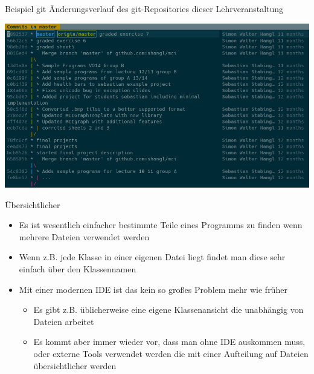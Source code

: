 \documentclass[presentation]{beamer}
\begin{document}
\begin{frame}[label={sec:orgfc16cf5}]{Beispiel git}
Änderungsverlauf des git-Repositories dieser Lehrveranstaltung
\begin{center}\begin{center}
\includegraphics[width=1.0\textwidth]{img/screenshot-20180608-171423.png}
\end{center}\end{center}
\end{frame}
\begin{frame}[label={sec:org2c17d14}]{Übersichtlicher}
\begin{itemize}
\item Es ist wesentlich einfacher bestimmte Teile eines Programms zu
finden wenn mehrere Dateien verwendet werden
\item Wenn z.B. jede Klasse in einer eigenen Datei liegt findet man diese
sehr einfach über den Klassennamen
\item Mit einer modernen IDE ist das kein so großes Problem mehr wie früher
\begin{itemize}
\item Es gibt z.B. üblicherweise eine eigene Klassenansicht die
unabhängig von Dateien arbeitet
\item Es kommt aber immer wieder vor, dass man ohne IDE auskommen muss,
oder externe Tools verwendet werden die mit einer Aufteilung auf
Dateien übersichtlicher werden
\end{itemize}
\end{itemize}
\end{frame}
\end{document}
